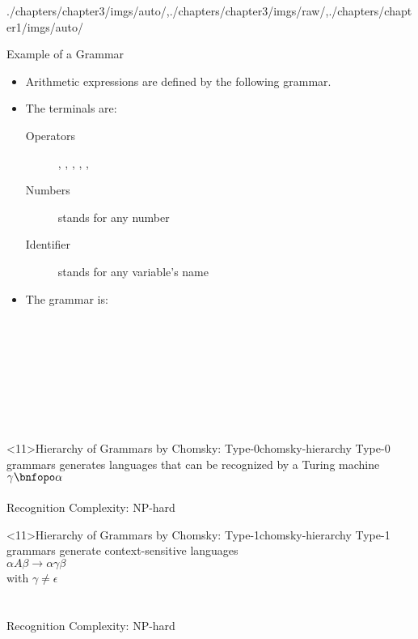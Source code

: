\begin{graphicspathcontext}{{./chapters/chapter3/imgs/auto/},{./chapters/chapter3/imgs/raw/},{./chapters/chapter1/imgs/auto/}}
\begin{bibunit}[apalike]
\begin{frame}[t,fragile,background={10}]{Example of a Grammar}
	\begin{itemize}
	\item Arithmetic expressions are defined by the following grammar.
	\item The terminals are: \begin{description}
		\item[Operators] \bnfts{+}, \bnfts{-}, \bnfts{*}, \bnfts{/}, \bnfts{(}, \bnfts{)}
		\item[Numbers]  stands for any number
		\item[Identifier]  stands for any variable's name
		\end{description}
	\item The grammar is:
	\end{itemize}
	\begin{bnf}
		 \\
		 \\
		 \\
		 \\
		 \\
		 \\
		 \\
	\end{bnf}
\end{frame}

\begin{rightlawnframe}<11>{{Hierarchy of Grammars} by Chomsky: Type-0}{chomsky-hierarchy}
	Type-0 grammars generates languages that can be recognized by a Turing machine \\[.5cm]
	$\gamma \bnfopo \alpha$ \\[.5cm]
	 \\[.5cm]
	Recognition Complexity: NP-hard
\end{rightlawnframe}

\begin{rightlawnframe}<11>{{Hierarchy of Grammars} by Chomsky: Type-1}{chomsky-hierarchy}
	Type-1 grammars generate context-sensitive languages \\[.5cm]
	$\alpha A\beta \rightarrow \alpha \gamma \beta$ \\
	with $\gamma\neq\epsilon$ \\[.5cm]
	 \\[.5cm]
	 \\[.5cm]
	Recognition Complexity: NP-hard
\end{rightlawnframe}


\end{bibunit}
\end{graphicspathcontext}
